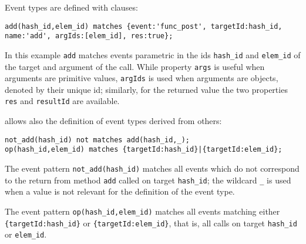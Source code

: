 Event types are defined with clauses:
\begin{lstlisting}[basicstyle=\ttfamily\scriptsize]
add(hash_id,elem_id) matches {event:'func_post', targetId:hash_id, name:'add', argIds:[elem_id], res:true};
\end{lstlisting}
In this example \lstinline{add} matches events parametric in the
ids \lstinline{hash_id} and \lstinline{elem_id} of the target and argument of the call. While property
\lstinline{args} is useful when arguments are primitive values, \lstinline{argIds} is used when arguments are objects, denoted by their unique id;
similarly, for the returned value the two properties \lstinline{res} and \lstinline{resultId} are available.




\rml allows also the definition of event types derived from others:

\begin{lstlisting}[basicstyle=\ttfamily\scriptsize]
not_add(hash_id) not matches add(hash_id,_);
op(hash_id,elem_id) matches {targetId:hash_id}|{targetId:elem_id};
\end{lstlisting}  
The event pattern \lstinline{not_add(hash_id)} matches all events which do not correspond to the return from
method \lstinline{add} called on target \lstinline{hash_id}; the wildcard \lstinline!_! is used when a value is not relevant for
the definition of the event type.

The event pattern \lstinline{op(hash_id,elem_id)} matches all events matching either \lstinline!{targetId:hash_id}! or
\lstinline!{targetId:elem_id}!, that is, all calls on target \lstinline{hash_id} or \lstinline{elem_id}.

